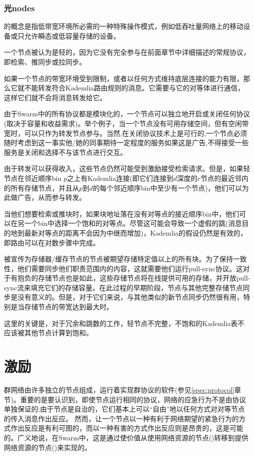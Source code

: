 \subsection{光nodes\statusgreen}
\label{sec:light}

的概念是指低带宽环境所必需的一种特殊操作模式，例如低吞吐量网络上的移动设备或只允许瞬态或低容量存储的设备。

一个节点被认为是轻的，因为它没有完全参与在前面章节中详细描述的常规协议，即检索、推同步或拉同步。

如果一个节点的带宽环境受到限制，或者以任何方式维持底层连接的能力有限，那么它就不能转发符合Kademlia路由规则的消息。它需要与它的对等体进行通信，这样它们就不会将消息转发给它。

由于Swarm中的所有协议都是模块化的，一个节点可以独立地开启或关闭任何协议(取决于容量和收益需求)。举个例子，当一个节点没有可用存储空间，但有空闲带宽时，可以只作为转发节点参与。当然,在关闭协议技术上是可行的,一个节点必须随时考虑到这一事实他/她的同事期待一定程度的服务如果这是广告,不得接受一些服务是关闭和选择不与该节点进行交互。

由于转发可以获得收入，这些节点仍然可能受到激励接受检索请求。但是，如果轻节点在邻近顺序bin $p$之上有Kademlia连接(即它们连接到$d$深度的$r$节点的最近邻内的所有存储节点，并且从$p$到$d$的每个邻近顺序bin中至少有一个节点)，他们可以为此做广告，从而参与转发。

当他们想要检索或推块时，如果块地址落在没有对等点的接近顺序bin中，他们可以在另一个bin中选择一个饱和的对等点。尽管这可能会导致一个虚假的跳(消息目的地到最新对等点的距离不会因为中继而增加)，Kademlia的假设仍然是有效的，即路由可以在对数步骤中完成。

被宣传为存储器/缓存节点的节点被期望存储特定值以上的所有块。为了保持一致性，他们需要同步他们职责范围内的内容，这就需要他们运行pull-sync协议。这对于有抱负的存储节点也是如此，这些存储节点将在线提供可用的存储，并开放pull-sync流来填充它们的存储容量。在此过程的早期阶段，节点与其他完整存储节点同步是没有意义的。但是，对于它们来说，与其他类似的新节点同步仍然很有用，特别是当存储节点的带宽达到最大时。

这里的关键是，对于冗余和跳数的工作，轻节点不完整，不饱和的Kademlia表不应该被其他节点计算到饱和。


\chapter{激励}\label{sec:incentivisation}
群网络由许多独立的节点组成，运行着实现群协议的软件(参见\ref{spec:protocol}章节)。重要的是要认识到，即使节点运行相同的协议，网络的应急行为不是由协议单独保证的;由于节点是自治的，它们基本上可以“自由”地以任何方式对对等节点的传入消息作出反应。
然而，让一个节点以一种有利于网络期望的紧急行为的方式作出反应是有利可图的，而以一种有害的方式作出反应则是昂贵的，这是可能的。广义地说，在Swarm中，这是通过使价值从使用网络资源的节点()转移到提供网络资源的节点()来实现的。 


